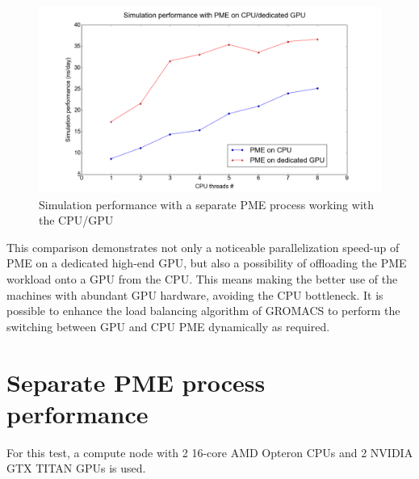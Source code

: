 \documentclass[12pt,a4paper]{report}
\newcommand{\draft}[1]{#1}
\begin{document}
\FloatBarrier
\begin{figure} [h!]
    \centering
    \includegraphics[width=1\textwidth]{pics/CPU_GPU_ADH.png}
    \caption{Simulation performance with a separate PME process working with the CPU/GPU}
    \label{fig:sepGPUNEW}
\end{figure}
\FloatBarrier

This comparison demonstrates not only a noticeable parallelization speed-up of PME on a dedicated high-end GPU, but also a possibility of offloading the PME workload onto a GPU from the CPU. This means making the better use of the machines with abundant GPU hardware, avoiding the CPU bottleneck. It is possible to enhance the load balancing algorithm of GROMACS to perform the switching between GPU and CPU PME dynamically as required.


 
    
\iffalse

\section{Separate PME process performance}

For this test, a compute node with 2 16-core AMD Opteron CPUs and 2 NVIDIA GTX TITAN GPUs is used.
\end{document}
